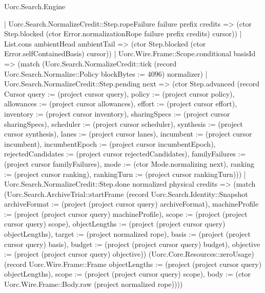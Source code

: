 \begin{lexlean}{Uorc.Search.Engine}
\begin{semanticmodule}
{          | Uorc.Search.NormalizeCredit::Step.ropeFailure failure prefix credits => (ctor Step.blocked (ctor Error.normalizationRope failure prefix credits) cursor))
        | List.cons ambientHead ambientTail => (ctor Step.blocked (ctor Error.selfContainedBasis) cursor))
      | Uorc.Wire.Frame::Scope.conditional basisId => (match (Uorc.Search.NormalizeCredit::tick (record Uorc.Search.Normalize::Policy {blockBytes := 4096}) normalizer)
        | Uorc.Search.NormalizeCredit::Step.pending next => (ctor Step.advanced (record Cursor {query := (project cursor query), policy := (project cursor policy), allowances := (project cursor allowances), effort := (project cursor effort), inventory := (project cursor inventory), sharingSpecs := (project cursor sharingSpecs), scheduler := (project cursor scheduler), synthesis := (project cursor synthesis), lanes := (project cursor lanes), incumbent := (project cursor incumbent), incumbentEpoch := (project cursor incumbentEpoch), rejectedCandidates := (project cursor rejectedCandidates), familyFailures := (project cursor familyFailures), mode := (ctor Mode.normalizing next), ranking := (project cursor ranking), rankingTurn := (project cursor rankingTurn)}))
        | Uorc.Search.NormalizeCredit::Step.done normalized physical credits => (match (Uorc.Search.ArchiveTrial::startFrame (record Uorc.Search.Identity::Snapshot {archiveFormat := (project (project cursor query) archiveFormat), machineProfile := (project (project cursor query) machineProfile), scope := (project (project cursor query) scope), objectLengths := (project (project cursor query) objectLengths), target := (project normalized rope), basis := (project (project cursor query) basis), budget := (project (project cursor query) budget), objective := (project (project cursor query) objective)}) (Uorc.Core.Resources::zeroUsage) (record Uorc.Wire.Frame::Frame {objectLengths := (project (project cursor query) objectLengths), scope := (project (project cursor query) scope), body := (ctor Uorc.Wire.Frame::Body.raw (project normalized rope))}))
}
\end{semanticmodule}
\end{lexlean}
